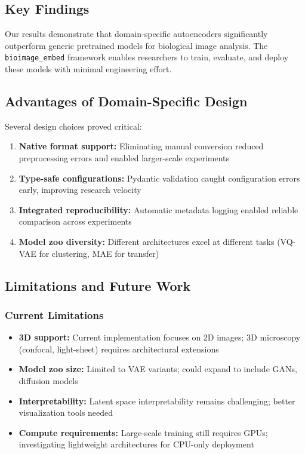 \subsection{Key Findings}

Our results demonstrate that domain-specific autoencoders significantly outperform generic pretrained models for biological image analysis. The \texttt{bioimage\_embed} framework enables researchers to train, evaluate, and deploy these models with minimal engineering effort.

\subsection{Advantages of Domain-Specific Design}

Several design choices proved critical:

\begin{enumerate}
    \item \textbf{Native format support:} Eliminating manual conversion reduced preprocessing errors and enabled larger-scale experiments
    \item \textbf{Type-safe configurations:} Pydantic validation caught configuration errors early, improving research velocity
    \item \textbf{Integrated reproducibility:} Automatic metadata logging enabled reliable comparison across experiments
    \item \textbf{Model zoo diversity:} Different architectures excel at different tasks (VQ-VAE for clustering, MAE for transfer)
\end{enumerate}

\subsection{Limitations and Future Work}

\subsubsection{Current Limitations}

\begin{itemize}
    \item \textbf{3D support:} Current implementation focuses on 2D images; 3D microscopy (confocal, light-sheet) requires architectural extensions
    \item \textbf{Model zoo size:} Limited to VAE variants; could expand to include GANs, diffusion models
    \item \textbf{Interpretability:} Latent space interpretability remains challenging; better visualization tools needed
    \item \textbf{Compute requirements:} Large-scale training still requires GPUs; investigating lightweight architectures for CPU-only deployment
\end{itemize}

